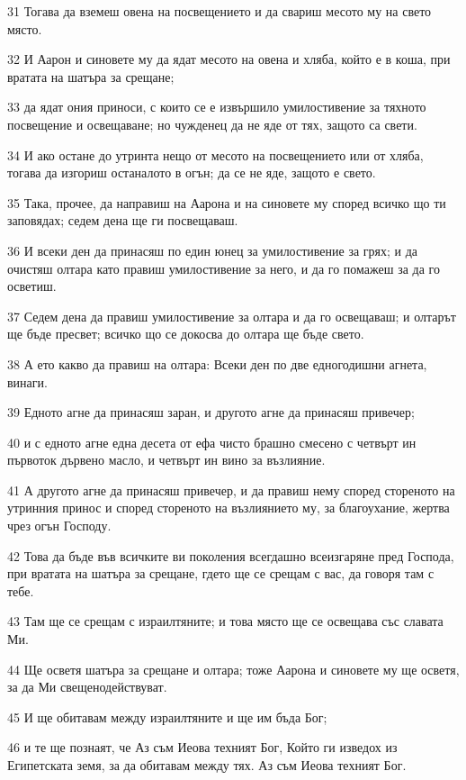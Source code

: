 \par 31 Тогава да вземеш овена на посвещението и да свариш месото му на свето място.
\par 32 И Аарон и синовете му да ядат месото на овена и хляба, който е в коша, при вратата на шатъра за срещане;
\par 33 да ядат ония приноси, с които се е извършило умилостивение за тяхното посвещение и освещаване; но чужденец да не яде от тях, защото са свети.
\par 34 И ако остане до утринта нещо от месото на посвещението или от хляба, тогава да изгориш останалото в огън; да се не яде, защото е свето.
\par 35 Така, прочее, да направиш на Аарона и на синовете му според всичко що ти заповядах; седем дена ще ги посвещаваш.
\par 36 И всеки ден да принасяш по един юнец за умилостивение за грях; и да очистяш олтара като правиш умилостивение за него, и да го помажеш за да го осветиш.
\par 37 Седем дена да правиш умилостивение за олтара и да го освещаваш; и олтарът ще бъде пресвет; всичко що се докосва до олтара ще бъде свето.
\par 38 А ето какво да правиш на олтара: Всеки ден по две едногодишни агнета, винаги.
\par 39 Едното агне да принасяш заран, и другото агне да принасяш привечер;
\par 40 и с едното агне една десета от ефа чисто брашно смесено с четвърт ин първоток дървено масло, и четвърт ин вино за възлияние.
\par 41 А другото агне да принасяш привечер, и да правиш нему според стореното на утринния принос и според стореното на възлиянието му, за благоухание, жертва чрез огън Господу.
\par 42 Това да бъде във всичките ви поколения всегдашно всеизгаряне пред Господа, при вратата на шатъра за срещане, гдето ще се срещам с вас, да говоря там с тебе.
\par 43 Там ще се срещам с израилтяните; и това място ще се освещава със славата Ми.
\par 44 Ще осветя шатъра за срещане и олтара; тоже Аарона и синовете му ще осветя, за да Ми свещенодействуват.
\par 45 И ще обитавам между израилтяните и ще им бъда Бог;
\par 46 и те ще познаят, че Аз съм Иеова техният Бог, Който ги изведох из Египетската земя, за да обитавам между тях. Аз съм Иеова техният Бог.

